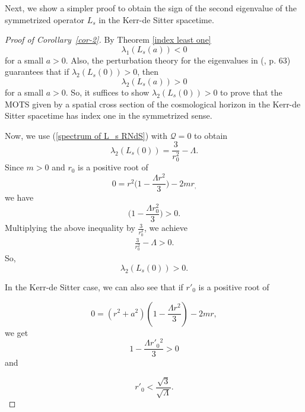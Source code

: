 \documentclass[a4paper, 11pt, reqno]{amsart}
\begin{document}
Next, we show a simpler proof to obtain the sign of the second eigenvalue of the symmetrized operator $L_s$ in the Kerr-de Sitter
spacetime.
\begin{proof}[Proof of Corollary~\ref{cor-2}]
By Theorem \ref{index least one}
\begin{equation*}
    \lambda_1(L_s(a))<0
\end{equation*}
for a small $a>0$. Also, the perturbation theory for the eigenvalues in (\cite{K}, p. 63) guarantees that if $\lambda_2(L_s(0))>0$, then
$$\lambda_2(L_s(a))>0$$
for a small $a>0$. So, it suffices to show $\lambda_2(L_s(0))>0$ to prove that the MOTS given by a spatial cross section of the cosmological horizon in the Kerr-de Sitter spacetime has index one in the symmetrized sense.

Now, we use (\ref{spectrum of L_s RNdS}) with $\mathcal{Q}=0$ to obtain
 \begin{equation*}
\lambda_2(L_s(0))=\frac{3}{r_0^2}-\Lambda.
 \end{equation*}
 Since $m>0$ and $r_0$ is a positive root of 
\begin{equation*}
    0=r^2\Big(1-\frac{\Lambda r^2}{3}\Big)-2mr_,
\end{equation*}
we have
$$\Big(1-\frac{\Lambda r_0^2}{3}\Big)>0.$$
Multiplying the above inequality by $\frac{3}{r_0^2}$, we achieve
 \begin{eqnarray*}
     \frac{3}{r_0^2}-\Lambda>0.
 \end{eqnarray*}
 So,
 $$\lambda_2(L_s(0))>0.$$
  
In the Kerr-de Sitter case, we can also see that if $r'_0$ is a positive root of 

$$0=(r^2+a^2)\left(1-\frac{\Lambda r^2}{3}\right)-2mr,$$
we get
$$1-\frac{\Lambda r'_{0}{^2}}{3}>0$$
and

\begin{equation*}
r'_0<\frac{\sqrt{3}}{\sqrt{\Lambda}}.
\end{equation*}

\end{proof}

\end{document}
